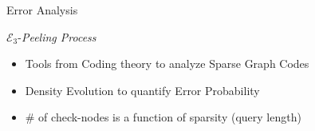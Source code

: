 \begin{frame}{Error Analysis}
{		\begin{block}{$\mathcal{E}_3${-\it Peeling Process}}
		\begin{itemize}
			\item Tools from Coding theory to analyze Sparse Graph Codes
			\item Density Evolution to quantify Error Probability
			\item \# of check-nodes is a function of sparsity (query length)
		\end{itemize}
		\end{block}
	}	
	
\end{frame}

